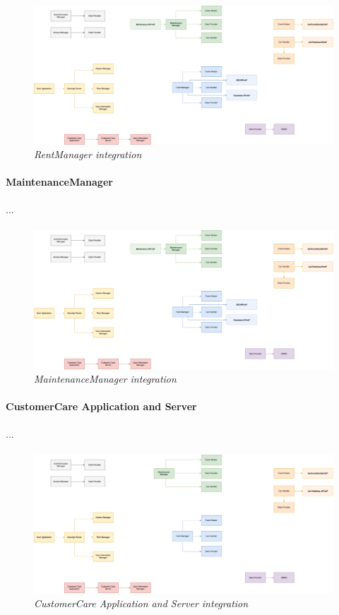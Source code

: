 		\begin{figure}[h]
			\centering
			\includegraphics[width=0.8\linewidth]{img/Integration3a}
			\caption{
				\label{fig:rentManager} 
				\emph{RentManager integration}
			}
		\end{figure}

\paragraph{MaintenanceManager} 
...
\paragraph{}
		
		\begin{figure}[h]
			\centering
			\includegraphics[width=0.8\linewidth]{img/Integration3b}
			\caption{
				\label{fig:maintenanceManager} 
				\emph{MaintenanceManager integration}
			}
		\end{figure}
		
\paragraph{CustomerCare Application and Server} 
...
\paragraph{}
		
		\begin{figure}[h]
			\centering
			\includegraphics[width=0.8\linewidth]{img/Integration3c}
			\caption{
				\label{fig:ccAppServer} 
				\emph{CustomerCare Application and Server integration}
			}
		\end{figure}
		
